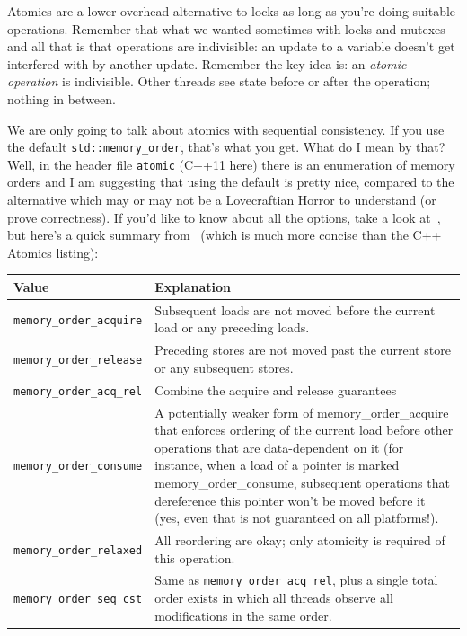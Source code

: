 \documentclass[a4paper]{report}
\begin{document}
Atomics are a lower-overhead alternative to
locks as long as you're doing suitable operations. Remember that what we wanted sometimes with locks and mutexes and all that is that operations are indivisible: an update to a variable doesn't get interfered with by another update. Remember the key idea is: an \textit{atomic operation} is indivisible. Other threads see state before or after the operation; nothing in between.


We are only going to talk about atomics with sequential consistency. If you use the default {\tt std::memory\_order}, that's what you get. What do I mean by that? Well, in the header file \texttt{atomic} (C++11 here) there is an enumeration of memory orders and I am suggesting that using the default is pretty nice, compared to the alternative which may or may not be a Lovecraftian Horror to understand (or prove correctness). If you'd like to know about all the options, take a look at~\cite{cppatomics}, but here's a quick summary from~\cite{bmref1} (which is much more concise than the C++ Atomics listing):

\begin{center}
	\begin{tabular}{l|p{12cm}}
	\textbf{Value} & \textbf{Explanation} \\ \hline
		\texttt{memory\_order\_acquire} &  Subsequent loads are not moved before the current load or any preceding loads.\\ \hline
		\texttt{memory\_order\_release} &  Preceding stores are not moved past the current store or any subsequent stores. \\ \hline
		\texttt{memory\_order\_acq\_rel} & Combine the acquire and release guarantees\\ \hline
		\texttt{memory\_order\_consume} & A potentially weaker form of memory\_order\_acquire that enforces ordering of the current load before other operations that are data-dependent on it (for instance, when a load of a pointer is marked memory\_order\_consume, subsequent operations that dereference this pointer won't be moved before it (yes, even that is not guaranteed on all platforms!).\\ \hline
	
	\texttt{memory\_order\_relaxed} & All reordering are okay; only atomicity is required of this operation. \\ \hline
\texttt{memory\_order\_seq\_cst} & Same as \texttt{memory\_order\_acq\_rel}, plus a single total order exists in which all threads observe all modifications in the same order.\\ 
	\end{tabular}

\end{center}
\end{document}
